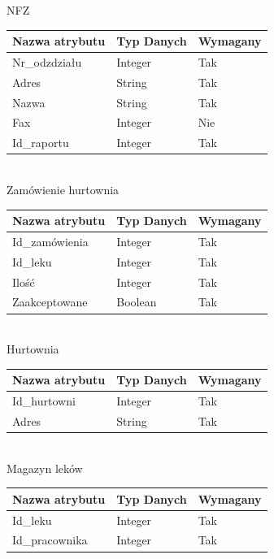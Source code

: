 \documentclass[a4paper, 11pt]{article}
\begin{document}
NFZ\\
\begin{tabular}{|l|l|l|} \hline
Nazwa  atrybutu	& Typ Danych	& Wymagany \\ \hline
Nr\_odzdziału	&Integer	&Tak\\ \hline
Adres	&String&	Tak\\ \hline
Nazwa	&String&	Tak\\ \hline
Fax	&Integer&	Nie\\ \hline
Id\_raportu	&Integer	&Tak\\ \hline
\end{tabular}\\[1cm]	

Zamówienie hurtownia\\
\begin{tabular}{|l|l|l|} \hline
Nazwa  atrybutu	& Typ Danych	& Wymagany \\ \hline
Id\_zamówienia	&Integer	&Tak\\ \hline
Id\_leku	&Integer	&Tak\\ \hline
Ilość	&Integer	&Tak\\ \hline
Zaakceptowane	&Boolean	&Tak\\ \hline
\end{tabular}\\[1cm]	

Hurtownia\\
\begin{tabular}{|l|l|l|} \hline
Nazwa   atrybutu	& Typ Danych	& Wymagany \\ \hline
Id\_hurtowni &	Integer	&Tak\\ \hline
Adres&	String&	Tak\\ \hline
\end{tabular}\\[1cm]	

Magazyn leków\\
\begin{tabular}{|l|l|l|} \hline
Nazwa  atrybutu	& Typ Danych	& Wymagany \\ \hline
Id\_leku	&Integer	&Tak\\ \hline
Id\_pracownika	&Integer	&Tak\\ \hline
\end{tabular}\\[1cm]	
\end{document}
